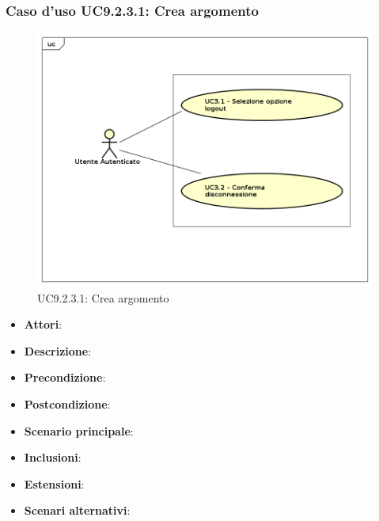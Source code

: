 			\subsubsection{Caso d'uso UC9.2.3.1: Crea argomento}
			\label{UC9.2.3.1}
			\begin{figure}[h]
				\centering
			\includegraphics[scale=0.7,keepaspectratio]{UML/UC9.png}
				\caption{UC9.2.3.1: Crea argomento}
			\end{figure}
			\FloatBarrier
			\begin{itemize}
				\item \textbf{Attori}: 
				\item \textbf{Descrizione}: 
				\item \textbf{Precondizione}: 
				\item \textbf{Postcondizione}: 
				\item \textbf{Scenario principale}:
				\item \textbf{Inclusioni}:
				\item \textbf{Estensioni}:
				\item \textbf{Scenari alternativi}:
			\end{itemize}
			

